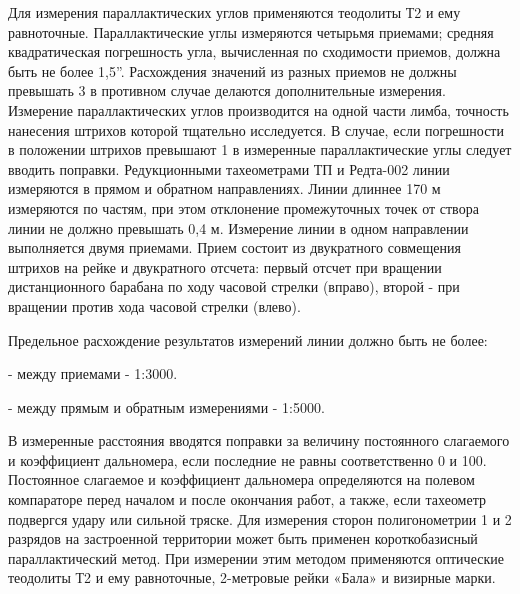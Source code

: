 \documentclass[a4paper]{article}
\begin{document}
\begin{newpage}
{        \par Для измерения параллактических углов применяются теодолиты Т2 и ему равноточные. Параллактические углы измеряются четырьмя приемами; средняя квадратическая погрешность угла, вычисленная по сходимости приемов, должна быть не более 1,5”. Расхождения значений из разных приемов не должны превышать 3 в противном случае делаются дополнительные измерения. Измерение параллактических углов производится на одной части лимба, точность нанесения штрихов которой тщательно исследуется. В случае, если погрешности в положении штрихов превышают 1 в измеренные параллактические углы следует вводить поправки. Редукционными тахеометрами ТП и Редта-002 линии измеряются в прямом и обратном направлениях. Линии длиннее 170 м измеряются по частям, при этом отклонение промежуточных точек от створа линии не должно превышать 0,4 м. Измерение линии в одном направлении выполняется двумя приемами. Прием состоит из двукратного совмещения штрихов на рейке и двукратного отсчета: первый отсчет при вращении дистанционного барабана по ходу часовой стрелки (вправо), второй - при вращении против хода часовой стрелки (влево).
        \par Предельное расхождение результатов измерений линии должно быть не более:
        \par - между приемами - 1:3000.
        \par - между прямым и обратным измерениями - 1:5000.
        \par В измеренные расстояния вводятся поправки за величину постоянного слагаемого и коэффициент дальномера, если последние не равны соответственно 0 и 100. Постоянное слагаемое и коэффициент дальномера определяются на полевом компараторе перед началом и после окончания работ, а также, если тахеометр подвергся удару или сильной тряске. Для измерения сторон полигонометрии 1 и 2 разрядов на застроенной территории может быть применен короткобазисный параллактический метод. При измерении этим методом применяются оптические теодолиты Т2 и ему равноточные, 2-метровые рейки «Бала» и визирные марки.
    }
    
\end{newpage}
\end{document}

